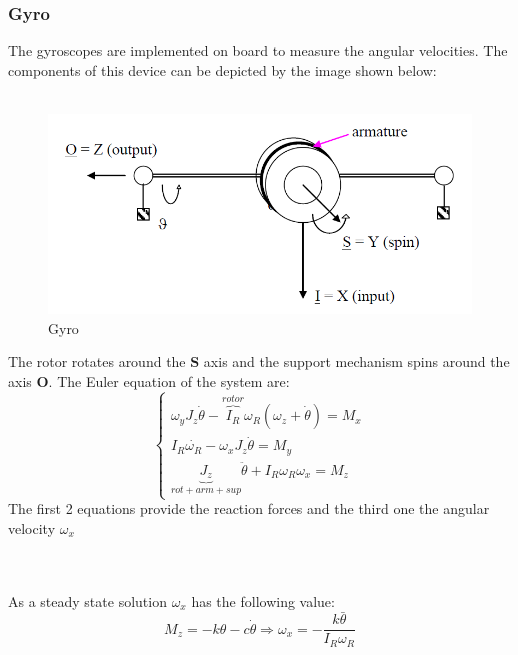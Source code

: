\documentclass[11pt]{article}
\begin{document}
\subsubsection{Gyro}
The gyroscopes are implemented on board to measure the angular velocities. The components of this device can be depicted by the image shown below:\\\\
\begin{minipage}{.5\textwidth}
\begin{figure} [H]
\centering 
\includegraphics[scale=0.53]{Gyro1.PNG}
\caption{ Gyro
\cite{Gyro1}}
\end{figure}
\end{minipage}
\begin{minipage}{.5\textwidth}
The rotor rotates around the $\mathbf{S}$ axis and the support mechanism spins around the axis $\mathbf{O}$. The Euler equation of the system  are:
\begin{equation}
\begin{cases}
\omega_yJ_z\dot{\theta}-\overbrace{I_R}^{rotor}\omega_R(\omega_z+\dot{\theta})=M_x\\
I_R\dot{\omega_R}-\omega_xJ_z\dot{\theta}=M_y\\
\underbrace{J_z}_{rot+arm+sup} \ddot{\theta}+I_R\omega_R\omega_x=M_z
\end{cases}
\end{equation}
The first 2 equations provide the reaction forces and the third one the angular velocity $\omega_x$
\end{minipage}\\\\
As a steady state solution $\omega_x$ has the following value:
\begin{equation}
M_z=-k\theta -c\dot{\theta} \Longrightarrow
\omega_x=-\frac{k\bar{\theta}}{I_R\omega_R}
\end{equation}
\end{document}
